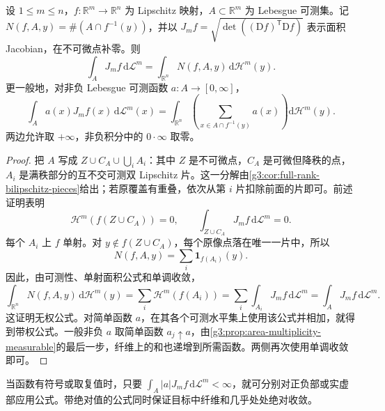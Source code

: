\begin{theorem}[面积公式]\label{g3:thm:lipschitz-area-formula}
	设 \(1\le m\le n\)，\(f:\mathbb R^m\to\mathbb R^n\) 为 Lipschitz 映射，\(A\subset\mathbb R^m\) 为 Lebesgue 可测集。记 \(N(f,A,y)=\#(A\cap f^{-1}(y))\)，并以 \(J_mf=\sqrt{\det((\mathrm Df)^{\mathsf T}\mathrm Df)}\) 表示面积 Jacobian，在不可微点补零。则
	\begin{equation}\label{g3:eq:lipschitz-area-formula}
		\int_AJ_mf\,\mathrm d\mathcal L^m
		=\int_{\mathbb R^n}N(f,A,y)\,\mathrm d\mathcal H^m(y).
	\end{equation}
	更一般地，对非负 Lebesgue 可测函数 \(a:A\to[0,\infty]\)，
	\begin{equation}\label{g3:eq:weighted-lipschitz-area-formula}
		\int_Aa(x)J_mf(x)\,\mathrm d\mathcal L^m(x)
		=\int_{\mathbb R^n}\left(\sum_{x\in A\cap f^{-1}(y)}a(x)\right)\mathrm d\mathcal H^m(y).
	\end{equation}
	两边允许取 \(+\infty\)，非负积分中的 \(0\cdot\infty\) 取零。
\end{theorem}
\begin{proof}
	把 \(A\) 写成 \(Z\cup C_A\cup\bigcup_iA_i\)：其中 \(Z\) 是不可微点，\(C_A\) 是可微但降秩的点，\(A_i\) 是满秩部分的互不交可测双 Lipschitz 片。这一分解由\cref{g3:cor:full-rank-bilipschitz-pieces}给出；若原覆盖有重叠，依次从第 \(i\) 片扣除前面的片即可。前述证明表明
	\[
		\mathcal H^m(f(Z\cup C_A))=0,
		\qquad \int_{Z\cup C_A}J_mf\,\mathrm d\mathcal L^m=0.
	\]
	每个 \(A_i\) 上 \(f\) 单射。对 \(y\notin f(Z\cup C_A)\)，每个原像点落在唯一一片中，所以
	\[
		N(f,A,y)=\sum_i\mathbf1_{f(A_i)}(y).
	\]
	因此，由可测性、单射面积公式和单调收敛，
	\[
		\int_{\mathbb R^n}N(f,A,y)\,\mathrm d\mathcal H^m(y)
		=\sum_i\mathcal H^m(f(A_i))
		=\sum_i\int_{A_i}J_mf\,\mathrm d\mathcal L^m
		=\int_AJ_mf\,\mathrm d\mathcal L^m.
	\]
	这证明无权公式。对简单函数 \(a\)，在其各个可测水平集上使用该公式并相加，就得到带权公式。一般非负 \(a\) 取简单函数 \(a_j\uparrow a\)，由\cref{g3:prop:area-multiplicity-measurable}的最后一步，纤维上的和也递增到所需函数。两侧再次使用单调收敛即可。
\end{proof}

当函数有符号或取复值时，只要 \(\int_A|a|J_mf\,\mathrm d\mathcal L^m<\infty\)，就可分别对正负部或实虚部应用公式。带绝对值的公式同时保证目标中纤维和几乎处处绝对收敛。

